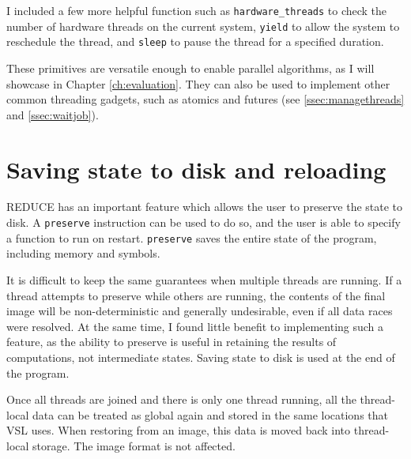 I included a few more helpful function such as \verb|hardware_threads| to check the number of hardware
threads on the current system, \verb|yield| to allow the system to reschedule the thread, and
\verb|sleep| to pause the thread for a specified duration.

These primitives are versatile enough to enable parallel algorithms, as I will showcase in Chapter \ref{ch:evaluation}.
They can also be used to implement other common threading gadgets, such as atomics and futures
(see \ref{ssec:managethreads} and \ref{ssec:waitjob}).

\section{Saving state to disk and reloading}
\label{sec:preserve}

REDUCE has an important feature which allows the user to preserve the state to disk. A \texttt{preserve} instruction can be
used to do so, and the user is able to specify a function to run on restart. \verb|preserve| saves the entire state of the
program, including memory and symbols.

It is difficult to keep the same guarantees when multiple threads are running.
If a thread attempts to preserve while others
are running, the contents of the final image will be non-deterministic and generally undesirable,
even if all data races were resolved. At the same time, I found little benefit to implementing such
a feature, as the ability to preserve is useful in retaining the results of computations, not intermediate states.
Saving state to disk is used at the end of the program.

Once all threads are joined and there is only one thread running, all the
thread-local data can be treated as global again and stored in the same locations that
VSL uses. When restoring from an image, this data is moved back into thread-local storage. The image
format is not affected.
